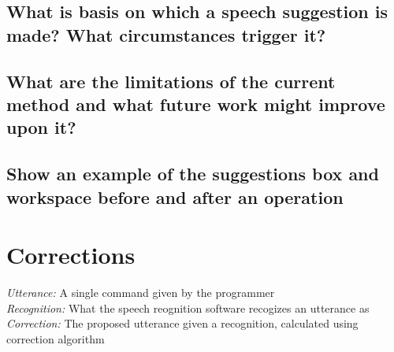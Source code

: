 \documentclass[]{article}
\begin{document}
\subsection{What is basis on which a speech suggestion is made? What circumstances trigger it?}

\subsection{What are the limitations of the current method and what future work might improve upon it?}

\subsection{Show an example of the suggestions box and workspace before and after an operation}

\section{Corrections}
\textit{Utterance:} A single command given by the programmer\\
\textit{Recognition:} What the speech reognition software recogizes an utterance as\\
\textit{Correction:} The proposed utterance given a recognition, calculated using correction algorithm\\
\end{document}
